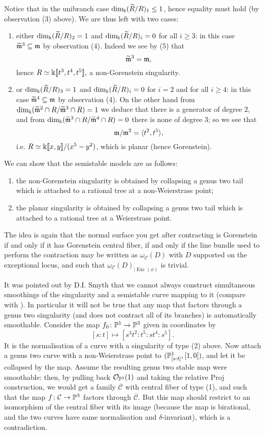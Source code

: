 Notice that in the unibranch case $\dim_\Bbbk(\widetilde{R}/R)_1\leq 1$, hence equality must hold (by observation (3) above). We are thus left with two cases:
 \begin{enumerate}
  \item either $\dim_\Bbbk(\widetilde{R}/R)_2=1$ and $\dim_\Bbbk(\widetilde{R}/R)_i=0$ for all $i\geq 3$: in this case $\widetilde{\mathfrak m}^3\subseteq\mathfrak m$ by observation (4). Indeed we see by (5) that \[\widetilde{\mathfrak m}^3=\mathfrak m,\] hence $R\simeq\Bbbk[\![t^3,t^4,t^5]\!],$ a non-Gorenstein singularity.
  
  \item or $\dim_\Bbbk(\widetilde{R}/R)_3=1$ and $\dim_\Bbbk(\widetilde{R}/R)_i=0$ for $i=2$ and for all $i\geq 4$: in this case $\widetilde{\mathfrak m}^4\subseteq\mathfrak m$ by observation (4). On the other hand from $\dim_\Bbbk(\widetilde{\mathfrak m}^2\cap R/\widetilde{\mathfrak m}^3\cap R)=1$ we deduce that there is a generator of degree $2$, and from $\dim_\Bbbk(\widetilde{\mathfrak m}^3\cap R/\widetilde{\mathfrak m}^4\cap R)=0$ there is none of degree $3$; so we see that \[\mathfrak m/\mathfrak m^2=\langle t^2,t^5\rangle,\] i.e. $R\simeq\Bbbk[\![x,y]\!]/(x^5-y^2)$, which is planar (hence Gorenstein).
 \end{enumerate}

We can show that the semistable models are as follows:
 \begin{enumerate}
  \item the non-Gorenstein singularity is obtained by collapsing a genus two tail which is attached to a rational tree at a non-Weierstrass point;
  \item the planar singularity is obtained by collapsing a genus two tail which is attached to a rational tree at a Weierstrass point.
 \end{enumerate}
The idea is again that the normal surface you get after contracting is Gorenstein if and only if it has Gorenstein central fiber, if and only if the line bundle used to perform the contraction may be written as $\omega_{\mathcal C}(D)$ with $D$ supported on the exceptional locus, and such that $\omega_{\mathcal C}(D)_{|\operatorname{Exc}(\phi)}$ is trivial.

\begin{rmk}
 It was pointed out by D.I. Smyth that we cannot always construct simultaneous smoothings of the singularity and a semistable curve mapping to it (compare with \cite[Lemma 2.11]{BCM}). In particular it will not be true that any map that factors through a genus two singularity (and does not contract all of its branches) is automatically smoothable. Consider the map $f_0\colon\mathbb P^1\rightarrow\mathbb P^3$ given in coordinates by \[ [s:t]\mapsto[s^3t^2:t^5:st^4:s^5].\]
 It is the normalisation of a curve with a singularity of type (2) above. Now attach a genus two curve with a non-Weierstrass point to $(\mathbb P^1_{[s:t]},[1,0])$, and let it be collapsed by the map. Assume the resulting genus two stable map were smoothable: then, by pulling back $\mathcal{O}_{\mathbb P^3}(1)$ and taking the relative Proj construction, we would get a family $\overline{\mathcal C}$ with central fiber of type (1), and such that the map $f\colon\mathcal C\rightarrow\mathbb P^3$ factors through $\overline{\mathcal C}$. But this map should restrict to an isomorphism of the central fiber with its image (because the map is birational, and the two curves have same normalisation and $\delta$-invariant), which is a contradiction.
\end{rmk}

